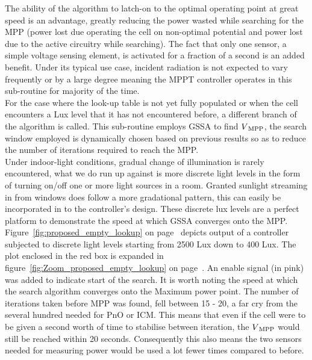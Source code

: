 The ability of the algorithm to latch-on to the optimal operating point at great speed is an advantage, greatly reducing the power wasted while searching for the \ac{MPP} (power lost due operating the cell on non-optimal potential and power lost due to the active circuitry while searching). The fact that only one sensor, a simple voltage sensing element, is activated for a fraction of a second is an added benefit. Under its typical use case, incident radiation is not expected to vary frequently or by a large degree meaning the \ac{MPPT} controller operates in this sub-routine for majority of the time.\\

For the case where the look-up table is not yet fully populated or when the cell encounters a Lux level that it has not encountered before, a different branch of the algorithm is called. This sub-routine employs \ac{GSSA} to find $V\textsubscript{MPP}$, the search window employed is dynamically chosen based on previous results so as to reduce the number of iterations required to reach the \ac{MPP}.\\

Under indoor-light conditions, gradual change of illumination is rarely encountered, what we do run up against is more discrete light levels in the form of turning on/off one or more light sources in a room. Granted sunlight streaming in from windows does follow a more gradational pattern, this can easily be incorporated in to the controller's design. These discrete lux levels are a perfect platform to demonstrate the speed at which \ac{GSSA} converges onto the \ac{MPP}.\\

Figure~\ref{fig:proposed_empty_lookup} on page~\pageref{fig:proposed_empty_lookup} depicts output of a controller subjected to discrete light levels starting from 2500 Lux down to 400 Lux. The plot enclosed in the red box is expanded in figure~\ref{fig:Zoom_proposed_empty_lookup} on page~\pageref{fig:Zoom_proposed_empty_lookup}. An enable signal (in pink) was added to indicate start of the search. It is worth noting the speed at which the search algorithm converges onto the Maximum power point. The number of iterations taken before \ac{MPP} was found, fell between 15 - 20, a far cry from the several hundred needed for \ac{PnO} or \ac{ICM}. This means that even if the cell were to be given a second worth of time to stabilise between iteration, the $V\textsubscript{MPP}$ would still be reached within 20 seconds. Consequently this also means the two sensors needed for measuring power would be used a lot fewer times compared to before. \\
       
